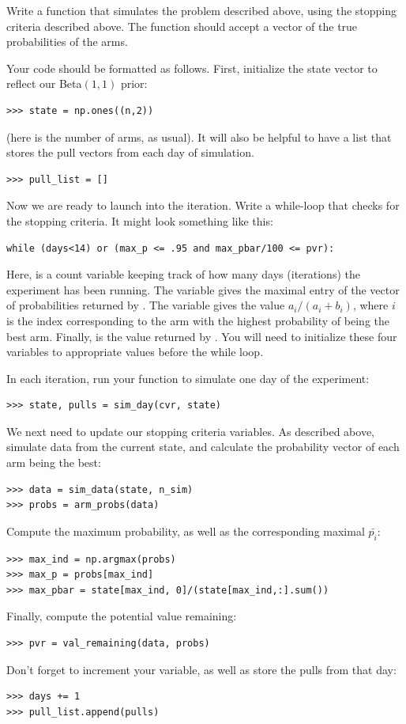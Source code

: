 \begin{problem}
Write a function  that simulates the problem described above,
using the stopping criteria described above.
The function should accept a vector of the true probabilities of the arms.

Your code should be formatted as follows.
First, initialize the state vector to reflect our Beta$(1,1)$ prior:
\begin{lstlisting}
>>> state = np.ones((n,2))
\end{lstlisting}
(here  is the number of arms, as usual).
It will also be helpful to have a list  that stores
the pull vectors from each day of simulation.
\begin{lstlisting}
>>> pull_list = []
\end{lstlisting}

Now we are ready to launch into the iteration.
Write a while-loop that checks for the stopping criteria.
It might look something like this:
\begin{lstlisting}
while (days<14) or (max_p <= .95 and max_pbar/100 <= pvr):
\end{lstlisting}
Here,  is a count variable keeping track of how many days (iterations) the experiment
has been running. The variable  gives the maximal entry of the vector of
probabilities returned by . The variable  gives the value
$a_i/(a_i+b_i)$, where $i$ is the index corresponding to the arm with the highest
probability of being the best arm. Finally,  is the value returned by
. You will need to initialize these four variables to appropriate
values before the while loop.

In each iteration, run your  function to simulate one day of the experiment:
\begin{lstlisting}
>>> state, pulls = sim_day(cvr, state)
\end{lstlisting}
We next need to update our stopping criteria variables.
As described above, simulate data from the current state, and calculate the
probability vector of each arm being the best:
\begin{lstlisting}
>>> data = sim_data(state, n_sim)
>>> probs = arm_probs(data)
\end{lstlisting}
Compute the maximum probability, as well as the corresponding maximal $\bar{p_i}$:
\begin{lstlisting}
>>> max_ind = np.argmax(probs)
>>> max_p = probs[max_ind]
>>> max_pbar = state[max_ind, 0]/(state[max_ind,:].sum())
\end{lstlisting}
Finally, compute the potential value remaining:
\begin{lstlisting}
>>> pvr = val_remaining(data, probs)
\end{lstlisting}
Don't forget to increment your  variable, as well as store the pulls from
that day:
\begin{lstlisting}
>>> days += 1
>>> pull_list.append(pulls)
\end{lstlisting}


\end{problem}
